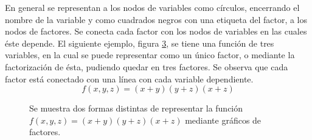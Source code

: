 \documentclass[11pt,twoside, spanish]{report} %
\begin{document}
En general se representan a los nodos de variables como c\'irculos, encerrando el nombre de la variable y como cuadrados negros con una etiqueta del factor, a los nodos de factores.
Se conecta cada factor con los nodos de variables en las cuales \'este depende.
El siguiente ejemplo, figura \ref{graph:FGej1}, se tiene una funci\'on de tres variables, en la cual se puede representar como un \'unico factor, o mediante la factorizaci\'on de \'esta, pudiendo quedar en tres factores. 
Se observa que cada factor est\'a conectado con una l\'inea con cada variable dependiente.
	\begin{equation*}
	f(x,y,z) = (x+y)(y+z)(x+z)
	\end{equation*}
\begin{center}

	\begin{figure}[H]
		\centering
		\begin{subfigure}{.5\textwidth}
			\centering
			\caption{}
			\label{graph:FGej1-1}
		\end{subfigure}%
		\begin{subfigure}{.5\textwidth}
			\centering
			\caption{}
			\label{graph:FGej1-2}
		\end{subfigure}
		\caption{Se muestra dos formas distintas de representar la funci\'on $f(x,y,z) = (x+y)(y+z)(x+z)$ mediante gr\'aficos de factores. }
		\label{graph:FGej1}
	\end{figure}
\end{center}
\end{document}
